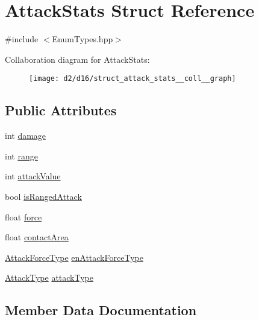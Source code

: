\hypertarget{struct_attack_stats}{}\section{Attack\+Stats Struct Reference}
\label{struct_attack_stats}


{\ttfamily \#include $<$Enum\+Types.\+hpp$>$}



Collaboration diagram for Attack\+Stats\+:\nopagebreak
\begin{figure}[H]
\begin{center}
\leavevmode
\texttt{[image: d2/d16/struct\_attack\_stats\_\_coll\_\_graph]}
\end{center}
\end{figure}
\subsection*{Public Attributes}
\begin{DoxyCompactItemize}
\item 
int \mbox{\hyperlink{struct_attack_stats_a358d827a9c95797171c79cecb4f907de}{damage}}
\item 
int \mbox{\hyperlink{struct_attack_stats_a6c771cd1408f202aa1c6b8bb0fff353b}{range}}
\item 
int \mbox{\hyperlink{struct_attack_stats_ae16d335630c1ff94a4147c9484818d35}{attack\+Value}}
\item 
bool \mbox{\hyperlink{struct_attack_stats_ae520cb405184191eef7d816e6ade41e4}{is\+Ranged\+Attack}}
\item 
float \mbox{\hyperlink{struct_attack_stats_ab351196c612dedf32664a1f1c98f49d0}{force}}
\item 
float \mbox{\hyperlink{struct_attack_stats_afaa92e7e1949f50eb1f6f4c6552265ba}{contact\+Area}}
\item 
\mbox{\hyperlink{_enum_types_8hpp_ad893f9959c49f07fb713f13630b7ee2d}{Attack\+Force\+Type}} \mbox{\hyperlink{struct_attack_stats_a9b9650abd264559a4a8914a67b070c1e}{en\+Attack\+Force\+Type}}
\item 
\mbox{\hyperlink{_enum_types_8hpp_a904b2f9c8f3951116c343784c59d6afe}{Attack\+Type}} \mbox{\hyperlink{struct_attack_stats_aacd65c62b2bc2d112d83a281940c6427}{attack\+Type}}
\end{DoxyCompactItemize}


\subsection{Member Data Documentation}
\mbox{\label{struct_attack_stats_aacd65c62b2bc2d112d83a281940c6427}} 
